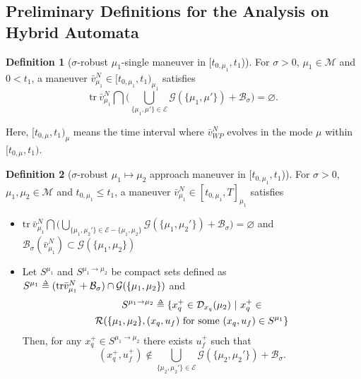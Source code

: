 \documentclass[letterpaper, 10 pt, conference]{ieeeconf}  %
\def\delequal{\mathrel{\ensurestackMath{\stackon[1pt]{=}{\scriptscriptstyle\Delta}}}}
\theoremstyle{definition}
\newtheorem{definition}{Definition}
\begin{document}
\subsection{Preliminary Definitions for the Analysis on Hybrid Automata}
\begin{definition}[$\sigma$-robust $\mu_1$-single maneuver in $[t_{0, \mu_1}, t_1$)]\label{def: robust single maneuver} 
For $\sigma > 0$, $\mu_1 \in \mathcal{M}$ and $0 < t_1$, a maneuver $\bar{v}^N_{\mu_1} \in [t_{0, \mu_1}, t_1)_{\mu_1}$ satisfies
\begin{equation}
    \textrm{tr} \ \bar{v}^N_{\mu_1} \bigcap \big( \bigcup_{\{  \mu_1,  \mu' \} \in \mathcal{E}} \mathcal{G}(\{ \mu_1, \mu' \}) + \mathcal{B}_{\sigma} \big) = \varnothing.
\end{equation}  
\end{definition} 
Here, $[t_{0, \mu}, t_1)_{\mu}$ means the time interval where $\bar{v}^N_{WP}$ evolves in the mode $\mu$ within $[t_{0, \mu}, t_1)$.

\begin{definition}[$\sigma$-robust $\mu_{1} \mapsto \mu_{2}$ approach maneuver in $[t_{0, \mu_1},t_1 $)]\label{def: robust approach maneuver} 
For $\sigma > 0$, $\mu_1, \mu_2 \in \mathcal{M}$ and $t_{0, \mu_1} \leq t_1$, a maneuver $\bar{v}^N_{\mu_1} \in [t_{0, \mu_1}, T]_{\mu_1}$ satisfies
\begin{itemize}
    \item $\textrm{tr} \ \bar{v}^N_{\mu_1} \bigcap \big( \bigcup_{\{ \mu_1, \mu_2' \} \in \mathcal{E}-\{ \mu_1, \mu_2 \}} \mathcal{G}(\{ \mu_1, \mu_2' \}) + \mathcal{B}_{\sigma} \big) = \varnothing$ and $\mathcal{B}_{\sigma}(\bar{v}^N_{\mu_1}) \subset \mathcal{G}(\{ \mu_1, \mu_2 \})$
    \item Let $S^{\mu_1}$ and $S^{\mu_1 \rightarrow \mu_2}$ be compact sets defined as $S^{\mu_1} \delequal (\textrm{tr} \bar{v}^N_{\mu_1} + \mathcal{B}_{\sigma}) \cap \mathcal{G}(\{ \mu_1, \mu_2 \})$ and
    \begin{multline}
        S^{\mu_1 \rightarrow \mu_2} \delequal \{x_q^{+} \in \mathcal{D}_{x_q}(\mu_2) \ | \ x_q^{+} \in \\ \mathcal{R}(\{ \mu_1, \mu_2 \}, (x_q,u_f) \ \textrm{for some} \ (x_q,u_f) \in S^{\mu_1} \}
    \end{multline}
    Then, for any $x_q^{+} \in S^{\mu_1 \rightarrow \mu_2}$ there exists $u_f^{+}$ such that 
    \begin{equation}
        (x_q^{+}, u_f^{+}) \notin \bigcup_{\{ \mu_2, \mu_2' \} \in \mathcal{E}} \mathcal{G}(\{ \mu_2, \mu_2' \}) + \mathcal{B}_{\sigma}.
    \end{equation} 
\end{itemize}
\end{definition}
\end{document}
